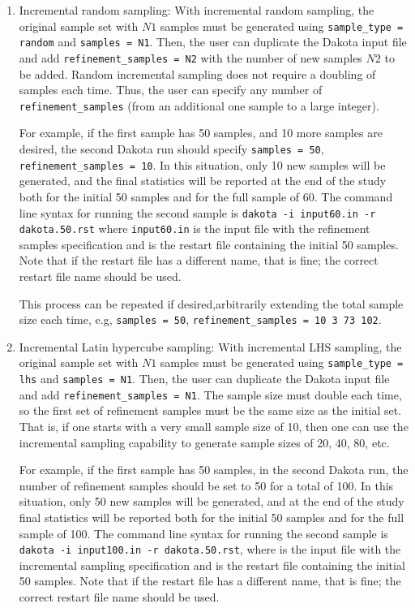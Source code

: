 \begin{enumerate}

\item Incremental random sampling: With incremental random sampling,
  the original sample set with $N1$ samples must be generated using
  \texttt{sample\_type = random} and \texttt{samples = N1}.  Then, the
  user can duplicate the Dakota input file and add
  \texttt{refinement\_samples = N2} with the number of new samples
  $N2$ to be added.  Random incremental sampling does not require a
  doubling of samples each time. Thus, the user can specify any number
  of \texttt{refinement\_samples} (from an additional one sample to a
  large integer).

  For example, if the first sample has 50 samples, and 10 more samples
  are desired, the second Dakota run should specify \texttt{samples =
    50}, \texttt{refinement\_samples = 10}.  In this situation, only
  10 new samples will be generated, and the final statistics will be
  reported at the end of the study both for the initial 50 samples and
  for the full sample of 60. The command line syntax for
  running the second sample is \texttt{dakota -i input60.in -r
    dakota.50.rst} where \texttt{input60.in} is the input file with
  the refinement samples specification and  is
  the restart file containing the initial 50 samples.  Note that if
  the restart file has a different name, that is fine; the correct
  restart file name should be used.

  This process can be repeated if desired,arbitrarily extending the
  total sample size each time, e.g, \texttt{samples = 50},
  \texttt{refinement\_samples = 10  3  73  102}.

\item Incremental Latin hypercube sampling: With incremental LHS
  sampling, the original sample set with $N1$ samples must be
  generated using \texttt{sample\_type = lhs} and \texttt{samples =
    N1}.  Then, the user can duplicate the Dakota input file and add
  \texttt{refinement\_samples = N1}.  The sample size must double each
  time, so the first set of refinement samples must be the same size
  as the initial set.  That is, if one starts with a very small sample
  size of 10, then one can use the incremental sampling capability to
  generate sample sizes of 20, 40, 80, etc.

  For example, if the first sample has 50 samples, in the second
  Dakota run, the number of refinement samples should be set to 50 for
  a total of 100. In this situation, only 50 new samples will be
  generated, and at the end of the study final statistics will be reported 
  both for the initial 50 samples and for the full sample of 100. The command 
  line syntax for running the second sample
  is \texttt{dakota -i input100.in -r dakota.50.rst}, where
   is the input file with the incremental sampling
  specification and  is the restart file
  containing the initial 50 samples.  Note that if the restart file
  has a different name, that is fine; the correct restart file name
  should be used.


\end{enumerate}
